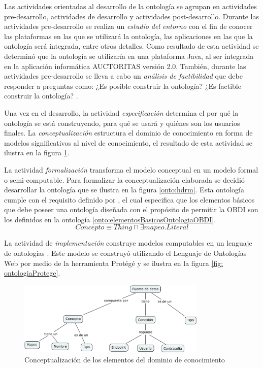 Las actividades orientadas al desarrollo de la ontología se agrupan en actividades pre-desarrollo, actividades de desarrollo y actividades post-desarrollo. Durante las actividades pre-desarrollo se realiza un \textit{estudio del entorno} con el fin de conocer las plataformas en las que se utilizará la ontología, las aplicaciones en las que la ontología será integrada, entre otros detalles. Como resultado de esta actividad se determinó que la ontología se utilizaría en una plataforma Java, al ser integrada en la aplicación informática AUCTORITAS versión 2.0. También, durante las actividades pre-desarrollo se lleva a cabo un \textit{análisis de factibilidad} que debe responder a preguntas como: ¿Es posible construir la ontología? ¿Es factible construir la ontología? \citep{Gomez-Perez:2007:OEE:1199560}.

Una vez en el desarrollo, la actividad \textit{especificación} determina el por qué la ontología se está construyendo, para qué se usará y quiénes son los usuarios finales. La \textit{conceptualización} estructura el dominio de conocimiento en forma de modelos significativos al nivel de conocimiento, el resultado de esta actividad se ilustra en la figura \ref{fig: mapaConceptual}. 

La actividad \textit{formalización} transforma el modelo conceptual en un modelo formal o semi-computable. Para formalizar la conceptualización elaborada se decidió desarrollar la ontología que se ilustra en la figura \ref{onto:hdrm}. Esta ontología cumple con el requisito definido por \cite{Calvanese2017}, el cual especifica que los elementos básicos que debe poseer una ontología diseñada con el propósito de permitir la OBDI son los definidos en la ontología \ref{onto:elementosBasicosOntologiaOBDI}.\\

\begin{equation}
Concepto \equiv Thing \sqcap \exists mapeo.Literal
\label{onto:elementosBasicosOntologiaOBDI}
\end{equation}

La actividad de \textit{implementación} construye modelos computables en un lenguaje de ontologías \citep{Gomez-Perez:2007:OEE:1199560}. Este modelo se construyó utilizando el Lenguaje de Ontologías Web por medio de la herramienta Protégé y se ilustra en la figura \ref{fig: ontologiaProtege}.\\

\begin{figure}
\begin{center}
	\includegraphics[width=0.8\textwidth]{img/mapaConceptual.png}
\end{center}
\caption{Conceptualización de los elementos del dominio de conocimiento}
\label{fig: mapaConceptual}
\end{figure}

